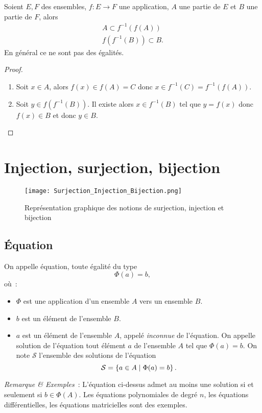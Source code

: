 %
\begin{prop}
  Soient \(E,F\) des ensembles, \(f:E\longrightarrow F\) une application, \(A\) une partie de \(E\) et \(B\) une partie de \(F\), alors
  \begin{gather}
    A \subset f^{-1}(f(A)) \\
    f(f^{-1}(B)) \subset B.
  \end{gather}
  En général ce ne sont pas des égalités.
\end{prop}
\begin{proof}
  \begin{enumerate}
  \item Soit \(x \in A\), alors \(f(x) \in f(A) = C\) donc \(x \in f^{-1}(C)=f^{-1}(f(A))\).
  \item Soit \(y \in f(f^{-1}(B))\). Il existe alors \(x \in f^{-1}(B)\) tel que \(y=f(x)\) donc \(f(x) \in B\) et donc \(y \in B\).
  \end{enumerate}
\end{proof}
%
\section{Injection, surjection, bijection}
\label{chap3-sec:injsurbij}
%
\begin{figure}
  \centering
  \texttt{[image: Surjection\_Injection\_Bijection.png]}
  \caption[Surjection, injection et bijection]{Représentation graphique des notions de surjection, injection et bijection}
  \label{chap3-fig:surjinjbij}
\end{figure}
%
\subsection{Équation}
\label{chap3-subsec:equation}
\begin{defdef}
  On appelle équation, toute égalité du type
  \begin{equation}
    \Phi(a)=b,
  \end{equation}
  où~:
  \begin{itemize}
  \item \(\Phi\) est une application d'un ensemble \(A\) vers un ensemble \(B\).
  \item \(b\) est un élément de l'ensemble \(B\).
  \item \(a\) est un élément de l'ensemble \(A\), appelé \emph{inconnue} de l'équation. On appelle solution de l'équation tout élément \(a\) de l'ensemble \(A\) tel que \(\Phi(a)=b\). On note \(\mathcal{S}\) l'ensemble des solutions de l'équation
    \begin{equation}
      \mathcal{S} = \left\{a \in A\mathrel{}\middle|\mathrel{}\Phi(a)=b\right\}.
    \end{equation}
  \end{itemize}
\end{defdef}
\emph{Remarque \& Exemples}~: L'équation ci-dessus admet au moins une solution si et seulement si \(b \in \Phi(A)\). Les équations polynomiales de degré \(n\), les équations différentielles, les équations matricielles sont des exemples.
%
